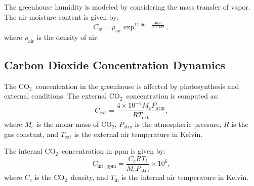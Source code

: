\documentclass[conference]{IEEEtran}
\newcommand{\coo}{\ensuremath{\mathrm{CO_2}}}
\begin{document}
The greenhouse humidity is modeled by considering the mass transfer of vapor. The air moisture content is given by:
\begin{equation}
    C_w = \rho_{\text{air}} \exp^{11.56 - \frac{4030}{T + 235}},
\end{equation}
where \(\rho_{\text{air}}\) is the density of air.


\subsection{Carbon Dioxide Concentration Dynamics}

The \coo\ concentration in the greenhouse is affected by photosynthesis and external conditions. The external \coo\ concentration is computed as:
\begin{equation}
    C_{\text{ext}} = \frac{4 \times 10^{-4}  M_c  P_{\text{atm}}}{R  T_{\text{ext}}},
\end{equation}
where \(M_c\) is the molar mass of \coo, \(P_{\text{atm}}\) is the atmospheric pressure, \(R\) is the gas constant, and \(T_{\text{ext}}\) is the external air temperature in Kelvin.

The internal \coo\ concentration in ppm is given by:
\begin{equation}
    C_{\text{int, ppm}} = \frac{C_c  R  T_i}{M_c  P_{\text{atm}}} \times 10^6,
\end{equation}
where \(C_c\) is the \coo\ density, and \(T_{\text{in}}\) is the internal air temperature in Kelvin.
\end{document}

